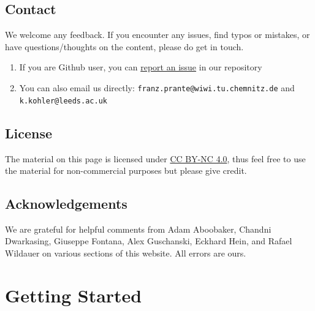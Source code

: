 \documentclass[
  letterpaper,
  DIV=11,
  numbers=noendperiod]{scrreprt}
\providecommand{\tightlist}{%
  \setlength{\itemsep}{0pt}\setlength{\parskip}{0pt}}\usepackage{longtable,booktabs,array}
\begin{document}
\section*{Contact}\label{contact}


We welcome any feedback. If you encounter any issues, find typos or
mistakes, or have questions/thoughts on the content, please do get in
touch.

\begin{enumerate}
\def\labelenumi{\arabic{enumi}.}
\tightlist
\item
  If you are Github user, you can
  \href{https://github.com/DIY-Macro-Sim/DIY-Macro-sim-website/issues/new}{report
  an issue} in our repository
\item
  You can also email us directly:
  \texttt{franz.prante@wiwi.tu.chemnitz.de} and
  \texttt{k.kohler@leeds.ac.uk}
\end{enumerate}

\section*{License}\label{license}


The material on this page is licensed under
\href{https://creativecommons.org/licenses/by-nc/4.0/?ref=chooser-v1}{CC
BY-NC 4.0}, thus feel free to use the material for non-commercial
purposes but please give credit.

\section*{Acknowledgements}\label{acknowledgements}


We are grateful for helpful comments from Adam Aboobaker, Chandni
Dwarkasing, Giuseppe Fontana, Alex Guschanski, Eckhard Hein, and Rafael
Wildauer on various sections of this website. All errors are ours.


\chapter{Getting Started}\label{sec-how-to-use}
\end{document}
